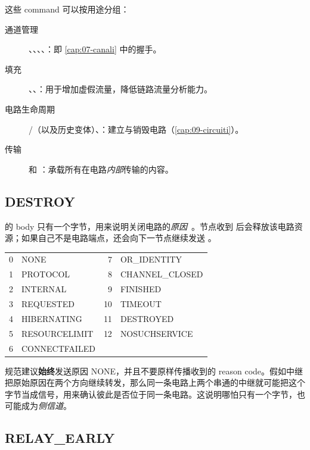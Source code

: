 这些 command 可以按用途分组：
\begin{description}
  \item[通道管理] 、、、、：即 \cref{cap:07-canali} 中的握手。
  \item[填充] 、、：用于增加虚假流量，降低链路流量分析能力。
  \item[电路生命周期] /（以及历史变体）、：建立与销毁电路（\cref{cap:09-circuiti}）。
  \item[传输]  和 ：承载所有在电路\emph{内部}传输的内容。
\end{description}

\subsection{DESTROY}

 的 body 只有一个字节，用来说明关闭电路的\emph{原因}~。节点收到  后会释放该电路资源；如果自己不是电路端点，还会向下一节点继续发送 。

\begin{center}\small
\begin{tabular}{rl@{\qquad}rl}
\toprule
0 & NONE & 7 & OR\_IDENTITY \\
1 & PROTOCOL & 8 & CHANNEL\_CLOSED \\
2 & INTERNAL & 9 & FINISHED \\
3 & REQUESTED & 10 & TIMEOUT \\
4 & HIBERNATING & 11 & DESTROYED \\
5 & RESOURCELIMIT & 12 & NOSUCHSERVICE \\
6 & CONNECTFAILED & & \\
\bottomrule
\end{tabular}
\end{center}

\begin{attenzione}[原因码也可能成为侧信道]
规范建议\textbf{始终}发送原因 NONE，并且不要原样传播收到的 reason code。假如中继把原始原因在两个方向继续转发，那么同一条电路上两个串通的中继就可能把这个字节当成信号，用来确认彼此是否位于同一条电路。这说明哪怕只有一个字节，也可能成为\emph{侧信道}。
\end{attenzione}

\subsection{RELAY\_EARLY}

